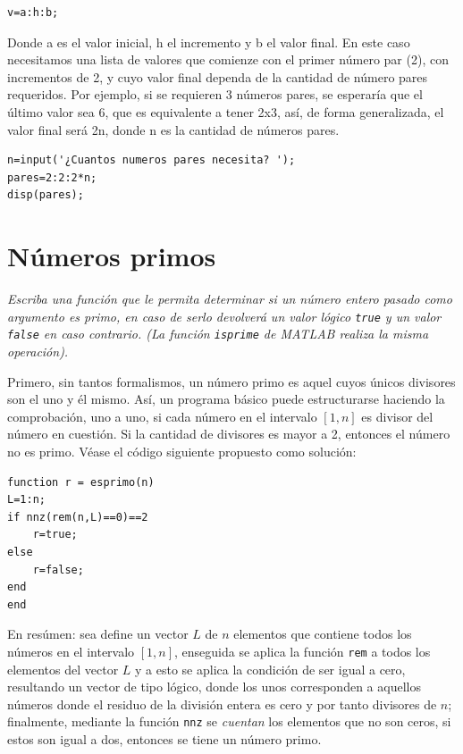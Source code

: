 \begin{verbatim}
v=a:h:b;
\end{verbatim}

Donde a es el valor inicial, h el incremento y b el valor final. En este caso necesitamos una lista 
de valores que comienze con el primer número par (2), con incrementos de 2, y cuyo valor final dependa 
de la cantidad de número pares requeridos. Por ejemplo, si se requieren 3 números pares, se esperaría que 
el último valor sea 6, que es equivalente a tener 2x3, así, de forma generalizada, el valor final será 
2n, donde n es la cantidad de números pares.

\begin{verbatim}
n=input('¿Cuantos numeros pares necesita? ');
pares=2:2:2*n;
disp(pares);
\end{verbatim}


\section{Números primos} 

\textit{Escriba una función que le permita determinar si un número entero pasado como argumento 
es primo, en caso de serlo devolverá un valor lógico {\tt true} y un valor {\tt false} en caso contrario. 
(La función {\tt isprime} de MATLAB realiza la misma operación).}



Primero, sin tantos formalismos, un número primo es aquel cuyos únicos divisores son el uno y él mismo. 
Así, un programa básico puede estructurarse haciendo la comprobación, uno a uno, si cada número en el intervalo 
$[1, n]$ es divisor del número en cuestión. Si la cantidad de divisores es mayor a 2, entonces el número 
no es primo. Véase el código siguiente propuesto como solución:

\begin{verbatim}
function r = esprimo(n)
L=1:n;
if nnz(rem(n,L)==0)==2
    r=true;
else
    r=false;
end
end
\end{verbatim}

En resúmen: sea define un vector $L$ de $n$ elementos que contiene todos los números en el intervalo $[1,n]$, 
enseguida se aplica la función {\tt rem} a todos los elementos del vector $L$ y a esto se aplica la condición 
de ser igual a cero, resultando un vector de tipo lógico, donde los unos corresponden a aquellos números donde 
el residuo de la división entera es cero y por tanto divisores de $n$; finalmente, mediante la función 
{\tt nnz} se {\it cuentan} los elementos que no son ceros, si estos son igual a dos, entonces se tiene un 
número primo.


